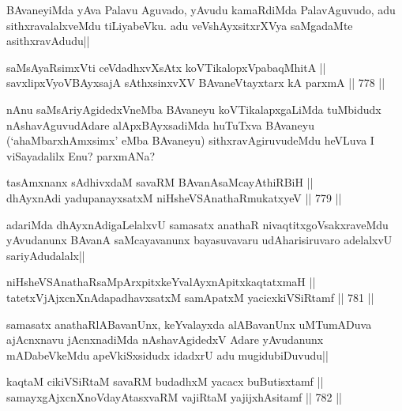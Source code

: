 \begin{artha} 
BAvaneyiMda yAva Palavu Aguvado, yAvudu kamaRdiMda PalavAguvudo, adu 
sithxravalalxveMdu tiLiyabeVku. adu veVshAyxsitxrXVya saMgadaMte 
asithxravAdudu||
\end{artha}

\begin{shl}
saMsAyaRsimxVti ceVdadhxvXsAtx koVTikalopxVpabaqMhitA || \\
savxlipxVyoVBAyxsajA sAthxsinxvXV BAvaneVtayxtarx kA parxmA ||  778 ||  
\end{shl}

\begin{artha} 
nAnu saMsAriyAgidedxVneMba BAvaneyu koVTikalapxgaLiMda tuMbidudx 
nAshavAguvudAdare alApxBAyxsadiMda huTuTxva BAvaneyu 
(`ahaMbarxhAmxsimx' eMba BAvaneyu) sithxravAgiruvudeMdu heVLuva I 
viSayadalilx Enu? parxmANa?
\end{artha}

\begin{shl}
tasAmxnanx sAdhivxdaM savaRM BAvanAsaMcayAthiRBiH || \\
dhAyxnAdi yadupanayxsatxM niHsheVSAnathaRmukatxyeV ||  779 ||  
\end{shl}

\begin{artha} 
adariMda dhAyxnAdigaLelalxvU samasatx anathaR nivaqtitxgoVsakxraveMdu 
yAvudanunx BAvanA saMcayavanunx bayasuvavaru udAharisiruvaro adelalxvU 
sariyAdudalalx||
\end{artha}

\begin{shl}
niHsheVSAnathaRsaMpArxpitxkeYvalAyxnApitxkaqtatxmaH || \\
tatetxVjAjxcnXnAdapadhavxsatxM samApatxM yacicxkiVSiRtamf ||  781 ||  
\end{shl}

\begin{artha} 
samasatx anathaRlABavanUnx, keYvalayxda alABavanUnx uMTumADuva 
ajAcnxnavu jAcnxnadiMda nAshavAgidedxV Adare yAvudanunx mADabeVkeMdu 
apeVkiSxsidudx idadxrU adu mugidubiDuvudu|| 
\end{artha}


\begin{shl}
kaqtaM cikiVSiRtaM savaRM budadhxM yacacx buButisxtamf || \\
samayxgAjxcnXnoVdayAtasxvaRM vajiRtaM yajijxhAsitamf ||  782 ||  
\end{shl}

